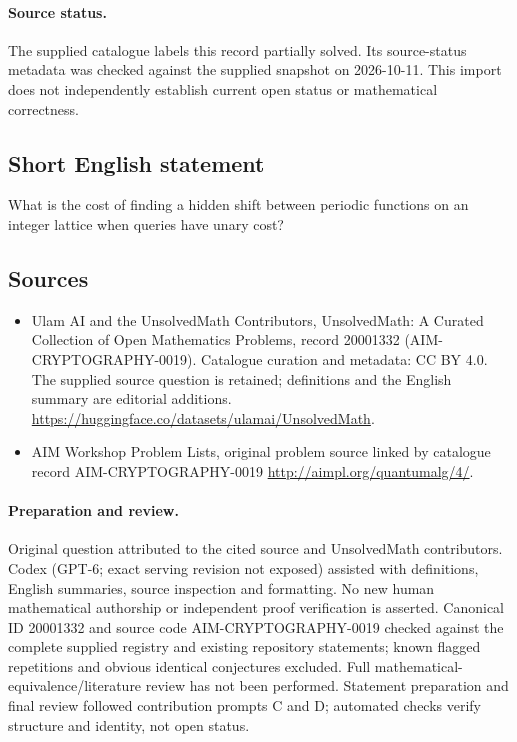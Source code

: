 \documentclass[11pt]{article}
\begin{document}
\paragraph{Source status.}
The supplied catalogue labels this record partially solved. Its source-status metadata was checked against the supplied snapshot on 2026-10-11. This import does not independently establish current open status or mathematical correctness.
\subsection{Short English statement}
What is the cost of finding a hidden shift between periodic functions on an integer lattice when queries have unary cost?
\subsection{Sources}
\begin{itemize}
\item[S1] Ulam AI and the UnsolvedMath Contributors, UnsolvedMath: A Curated Collection of Open Mathematics Problems, record 20001332 (AIM-CRYPTOGRAPHY-0019). Catalogue curation and metadata: CC BY 4.0. The supplied source question is retained; definitions and the English summary are editorial additions.
\url{https://huggingface.co/datasets/ulamai/UnsolvedMath}.
\item[S2] AIM Workshop Problem Lists, original problem source linked by catalogue record AIM-CRYPTOGRAPHY-0019
\url{http://aimpl.org/quantumalg/4/}.
\end{itemize}
\paragraph{Preparation and review.}
Original question attributed to the cited source and UnsolvedMath contributors. Codex (GPT-6; exact serving revision not exposed) assisted with definitions, English summaries, source inspection and formatting. No new human mathematical authorship or independent proof verification is asserted. Canonical ID 20001332 and source code AIM-CRYPTOGRAPHY-0019 checked against the complete supplied registry and existing repository statements; known flagged repetitions and obvious identical conjectures excluded. Full mathematical-equivalence/literature review has not been performed. Statement preparation and final review followed contribution prompts C and D; automated checks verify structure and identity, not open status.
\label{end:20001332}
\end{document}
